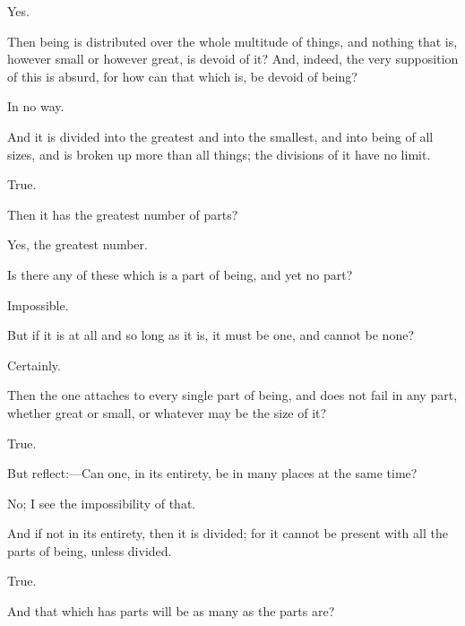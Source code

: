 \documentclass[11pt,letter]{article}
\begin{document}
\par  Yes.

\par  Then being is distributed over the whole multitude of things, and nothing that is, however small or however great, is devoid of it? And, indeed, the very supposition of this is absurd, for how can that which is, be devoid of being?

\par  In no way.

\par  And it is divided into the greatest and into the smallest, and into being of all sizes, and is broken up more than all things; the divisions of it have no limit.

\par  True.

\par  Then it has the greatest number of parts?

\par  Yes, the greatest number.

\par  Is there any of these which is a part of being, and yet no part?

\par  Impossible.

\par  But if it is at all and so long as it is, it must be one, and cannot be none?

\par  Certainly.

\par  Then the one attaches to every single part of being, and does not fail in any part, whether great or small, or whatever may be the size of it?

\par  True.

\par  But reflect:—Can one, in its entirety, be in many places at the same time?

\par  No; I see the impossibility of that.

\par  And if not in its entirety, then it is divided; for it cannot be present with all the parts of being, unless divided.

\par  True.

\par  And that which has parts will be as many as the parts are?
\end{document}
